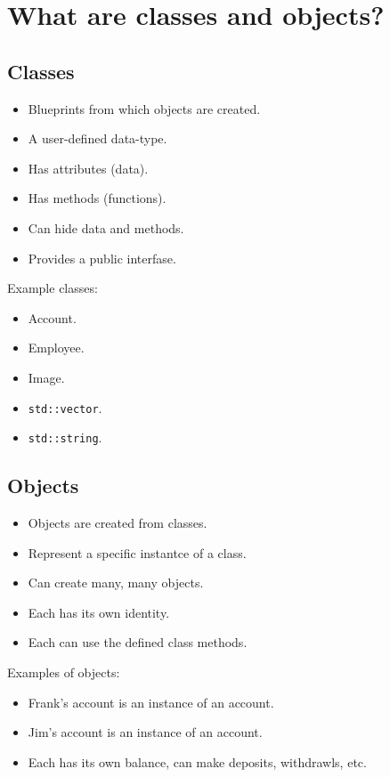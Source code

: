 \section{What are classes and objects?}
\subsection{Classes}
\begin{itemize}
    \item Blueprints from which objects are created.
    \item A user-defined data-type.
    \item Has attributes (data).
    \item Has methods (functions).
    \item Can hide data and methods.
    \item Provides a public interfase.
\end{itemize}
Example classes:
\begin{itemize}
    \item Account.
    \item Employee.
    \item Image.
    \item \texttt{std::vector}.
    \item \texttt{std::string}.
\end{itemize}

\subsection{Objects}
\begin{itemize}
    \item Objects are created from classes.
    \item Represent a specific instantce of a class.
    \item Can create many, many objects.
    \item Each has its own identity.
    \item Each can use the defined class methods. 
\end{itemize}
Examples of objects:
\begin{itemize}
    \item Frank's account is an instance of an account.
    \item Jim's account is an instance of an account.
    \item Each has its own balance, can make deposits, withdrawls, etc.
\end{itemize}

